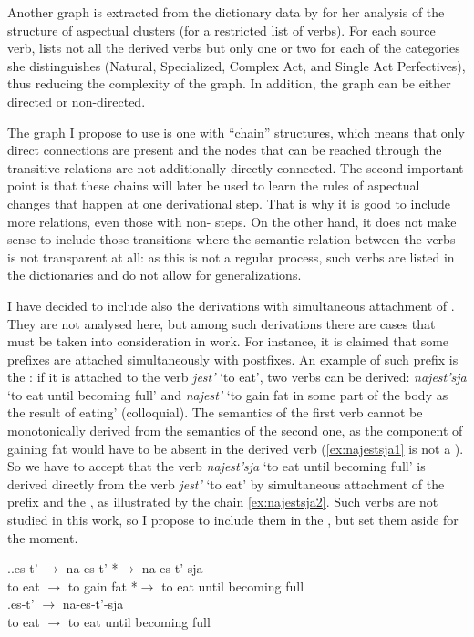Another graph is extracted from the dictionary data by \citet{Janda:07a} for her analysis of the structure of aspectual clusters (for a restricted list of verbs). For each source verb, \citeauthor{Janda:07a} lists not all the derived verbs but only one or two for each of the categories she distinguishes (Natural, Specialized, Complex Act, and Single Act Perfectives), thus reducing the complexity of the graph. In addition, the graph can be either directed or non-directed. 
 
The graph I propose to use is one with ``chain'' structures, which means that only direct connections are present and the nodes that can be reached through the transitive relations are not additionally directly connected. The second important point is that these chains will later be used to learn the rules of aspectual changes that happen at one derivational step. That is why it is good to include more relations, even those with non- steps. On the other hand, it does not make sense to include those transitions where the semantic relation between the verbs is not transparent at all: as this is not a regular process, such verbs are listed in the dictionaries and do not allow for generalizations. 

I have decided to include also the derivations with simultaneous attachment of . They are not analysed here, but among such derivations there are cases that must be taken into consideration in  work. For instance, it is claimed that some prefixes are attached simultaneously with postfixes. An example of such prefix is the  : if it is attached to the verb \textit{jest'} `to eat', two verbs can be derived: \textit{najest'sja} `to eat until becoming full' and \textit{najest'} `to gain fat in some part of the body as the result of eating' (colloquial). The semantics of the first verb cannot be  monotonically derived from the semantics of the second one, as the component of gaining fat would have to be absent in the derived verb (\ref{ex:najestsja1} is not a ). So we have to accept that the verb \textit{najest'sja} `to eat until becoming full' is derived directly from the verb \textit{jest'} `to eat' by simultaneous attachment of the prefix and the , as illustrated by the chain \ref{ex:najestsja2}. Such verbs are not studied in this work, so I propose to include them in the , but set them aside for the moment.
 
 \ex.\label{ex:najestsja}\ag.\label{ex:najestsja1}es-t'\textsuperscript{\IPF} $\rightarrow$ na-es-t'\textsuperscript{\PF} *$\rightarrow$ na-es-t'-sja\textsuperscript{\PF}\\	
{to eat} $\rightarrow$ {to gain fat} *$\rightarrow$ {to eat until becoming full}\\
\bg.\label{ex:najestsja2}es-t'\textsuperscript{\PF} $\rightarrow$ na-es-t'-sja\textsuperscript{\PF}\\
{to eat} $\rightarrow$ {to eat until becoming full}\\

